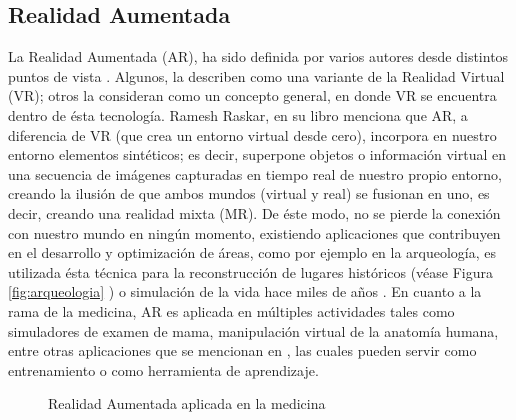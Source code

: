 \documentclass[a4paper,openright,12pt]{report}
\begin{document}
\subsection{Realidad Aumentada}
La Realidad Aumentada (AR), ha sido definida por varios autores desde distintos puntos de vista \cite{milgram1994,azuma1997}. Algunos, la describen como una variante de la Realidad Virtual (VR); otros la consideran como un concepto general, en donde VR se encuentra dentro de ésta tecnología. Ramesh Raskar, en su libro \cite{Bimber2005} menciona que AR, a diferencia de VR (que crea un entorno virtual desde cero), incorpora en nuestro entorno elementos sintéticos; es decir, superpone objetos o información virtual en una secuencia de imágenes capturadas en tiempo real de nuestro propio entorno, creando la ilusión de que ambos mundos (virtual y real) se fusionan en uno, es decir, creando una realidad mixta (MR). De éste modo, no se pierde la conexión con nuestro mundo en ningún momento, existiendo aplicaciones que contribuyen en el desarrollo y optimización de áreas, como por ejemplo en la arqueología, es utilizada ésta técnica para la reconstrucción de lugares históricos (véase Figura \ref{fig:arqueologia} ) o simulación de la vida hace miles de años \cite{vlahakis2002}. En cuanto a la rama de la medicina, AR es aplicada en múltiples actividades tales como simuladores de examen de mama, manipulación virtual de la anatomía humana, entre otras aplicaciones que se mencionan en \cite{bichlmeier2007}, las cuales pueden servir como entrenamiento o como herramienta de aprendizaje.
\begin{figure}[th]
	\centering
	\caption[Realidad Aumentada aplicada a la medicina]{Realidad Aumentada aplicada en la medicina} \label{fig:medicinaAR}
\end{figure}\\
\end{document}
